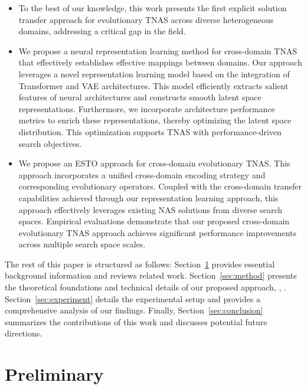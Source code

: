 \documentclass[../main.tex]{subfiles}
\begin{document}
\begin{itemize}
	\item To the best of our knowledge, this work presents the first explicit solution transfer approach for evolutionary TNAS across diverse heterogeneous domains, addressing a critical gap in the field.

	\item We propose a neural representation learning method for cross-domain TNAS that effectively establishes effective mappings between domains.
	      Our approach leverages a novel representation learning model based on the integration of Transformer and VAE architectures.
	      This model efficiently extracts salient features of neural architectures and constructs smooth latent space representations.
	      Furthermore, we incorporate architecture performance metrics to enrich these representations, thereby optimizing the latent space distribution.
	      This optimization supports TNAS with performance-driven search objectives.

	\item We propose an ESTO approach for cross-domain evolutionary TNAS\@.
	      This approach incorporates a unified cross-domain encoding strategy and corresponding evolutionary operators.
	      Coupled with the cross-domain transfer capabilities achieved through our representation learning approach, this approach effectively leverages existing NAS solutions from diverse search spaces.
	      Empirical evaluations demonstrate that our proposed cross-domain evolutionary TNAS approach achieves significant performance improvements across multiple search space scales.
\end{itemize}


The rest of this paper is structured as follows:
Section~\ref{sec:preliminary} provides essential background information and reviews related work.
Section~\ref{sec:method} presents the theoretical foundations and technical details of our proposed approach, \ie, \OUR{}.
Section~\ref{sec:experiment} details the experimental setup and provides a comprehensive analysis of our findings.
Finally, Section~\ref{sec:conclusion} summarizes the contributions of this work and discusses potential future directions.

\section{Preliminary}\label{sec:preliminary}
\end{document}
